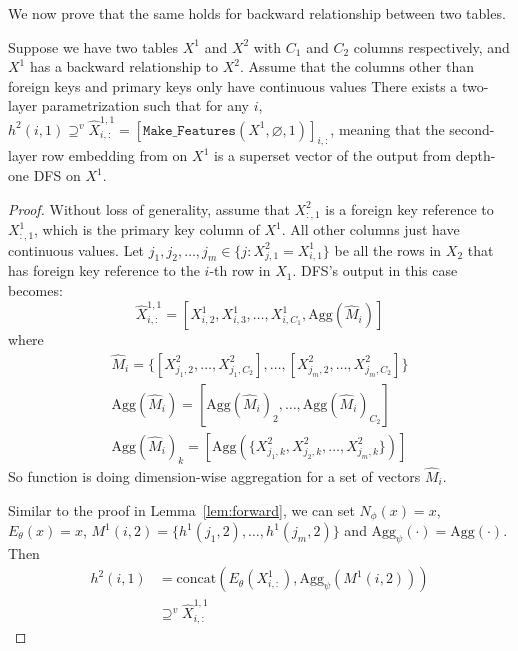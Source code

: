 We now prove that the same holds for backward relationship between two tables.

\begin{lemma}
    \label{lem:backward}
    Suppose we have two tables $X^1$ and $X^2$ with $C_1$ and $C_2$ columns respectively, and $X^1$ has a backward relationship to $X^2$.  Assume that the columns other than foreign keys and primary keys only have continuous values 
    There exists a two-layer \model{} parametrization such that for any $i$, $h^{2}(i, 1) \supseteq^v \hat{X}^{1,1}_{i,:}=[\texttt{Make\_Features}(X^1, \varnothing, 1)]_{i,:}$, meaning that the second-layer row embedding from \model{} on $X^1$ is a superset vector of the output from depth-one DFS on $X^1$. 
\end{lemma}

\begin{proof}
    Without loss of generality, assume that $X^2_{:, 1}$ is a foreign key reference to $X^1_{:, 1}$, which is the primary key column of $X^1$. All other columns just have continuous values. Let $j_1, j_2, \ldots, j_m \in \{j : X^2_{j, 1} = X^1_{i, 1}\}$ be all the rows in $X_2$ that has foreign key reference to the $i$-th row in $X_1$.  DFS's output in this case becomes:
    $$
    \hat{X}^{1,1}_{i,:} = [X^1_{i, 2}, X^1_{i, 3}, \ldots, X^1_{i,C_1}, \text{Agg}(\hat{M}_{i})]
    $$
    where
    $$
    \begin{gathered}
    \hat{M}_{i}=\{[X^2_{j_1,2},\ldots,X^2_{j_1,C_2}], \ldots, [X^2_{j_m, 2}, \ldots, X^2_{j_m, C_2}]\}\\
    \text{Agg}(\hat{M}_{i}) = [\text{Agg}(\hat{M}_{i})_2, \ldots, \text{Agg}(\hat{M}_{i})_{C_2}] \\
    \text{Agg}(\hat{M}_{i})_k = [\text{Agg}(\{X^2_{j_1, k}, X^2_{j_2, k}, \ldots, X^2_{j_m, k}\})]
    \end{gathered}
    $$
    So function  is doing dimension-wise aggregation for a set of vectors $\hat{M}_{i}$.
    
    Similar to the proof in Lemma~\ref{lem:forward}, we can set $N_\phi(x) = x$, $E_\theta(x) = x$, $M^1(i, 2) = \{h^1(j_1, 2), \ldots, h^1(j_m, 2)\}$ and $\text{Agg}_\psi(\cdot) = \text{Agg}(\cdot)$.  Then    
    $$
    \begin{aligned}
    h^2(i, 1) &= \text{concat}(E_\theta(X^1_{i,:}), \text{Agg}_\psi(M^1(i, 2))) \\
    &\supseteq^v \hat{X}^{1,1}_{i,:}
    \end{aligned}
    $$
\end{proof}

